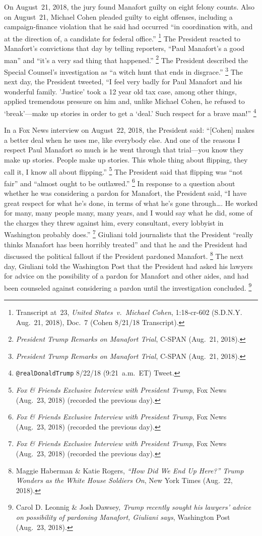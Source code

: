 On August~21, 2018, the jury found Manafort guilty on eight felony counts.
Also on August~21, Michael Cohen pleaded guilty to eight offenses, including a campaign-finance violation that he said had occurred ``in coordination with, and at the direction of, a candidate for federal office.''%
\footnote{Transcript at~23, \textit{United States~v.\ Michael Cohen}, 1:18-cr-602 (S.D.N.Y. Aug.~21, 2018), Doc.~7 (Cohen 8/21/18 Transcript).}
The President reacted to Manafort's convictions that day by telling reporters, ``Paul Manafort's a good man'' and ``it's a very sad thing that happened.''%
\footnote{\textit{President Trump Remarks on Manafort Trial}, C-SPAN (Aug.~21, 2018).}
The President described the Special Counsel's investigation as ``a witch hunt that ends in disgrace.''%
\footnote{\textit{President Trump Remarks on Manafort Trial}, C-SPAN (Aug.~21, 2018).}
The next day, the President tweeted, ``I feel very badly for Paul Manafort and his wonderful family.
'Justice' took a 12 year old tax case, among other things, applied tremendous pressure on him and, unlike Michael Cohen, he refused to `break'---make up stories in order to get a `deal.'
Such respect for a brave man!''%
\footnote{\verb+@realDonaldTrump+ 8/22/18 (9:21~a.m.~ET) Tweet.}

In a Fox News interview on August~22, 2018, the President said: ``[Cohen] makes a better deal when he uses me, like everybody else.
And one of the reasons I respect Paul Manafort so much is he went through that trial---you know they make up stories.
People make up stories.
This whole thing about flipping, they call it, I know all about flipping.''%
\footnote{\textit{Fox \& Friends Exclusive Interview with President Trump}, Fox News (Aug.~23, 2018) (recorded the previous day).}
The President said that flipping was ``not fair'' and ``almost ought to be outlawed.''%
\footnote{\textit{Fox \& Friends Exclusive Interview with President Trump}, Fox News (Aug.~23, 2018) (recorded the previous day).}
In response to a question about whether he was considering a pardon for Manafort, the President said, ``I have great respect for what he's done, in terms of what he's gone through\dots.
He worked for many, many people many, many years, and I would say what he did, some of the charges they threw against him, every consultant, every lobbyist in Washington probably does.''%
\footnote{\textit{Fox \& Friends Exclusive Interview with President Trump}, Fox News (Aug.~23, 2018) (recorded the previous day).}
Giuliani told journalists that the President ``really thinks Manafort has been horribly treated'' and that he and the President had discussed the political fallout if the President pardoned Manafort.%
\footnote{Maggie Haberman \& Katie Rogers, \textit{``How Did We End Up Here?'' Trump Wonders as the White House Soldiers On}, New York Times (Aug.~22, 2018).}
The next day, Giuliani told the Washington Post that the President had asked his lawyers for advice on the possibility of a pardon for Manafort and other aides, and had been counseled against considering a pardon until the investigation concluded.%
\footnote{Carol D. Leonnig \& Josh Dawsey, \textit{Trump recently sought his lawyers' advice on possibility of pardoning Manafort, Giuliani says}, Washington Post (Aug.~23, 2018).}

